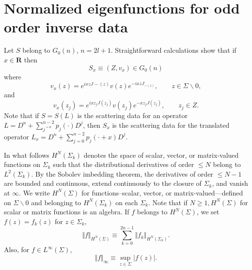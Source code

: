 \documentclass{surv-l}
\theoremstyle{plain}
\theoremstyle{definition}
\numberwithin{equation}{chapter}
\begin{document}
\section{Normalized eigenfunctions for odd order inverse data}\label{sec21} Let $S$ belong to $G_{0}(n)$, $n=2l + 1$. Straightforward calculations show that if $x\in \mathbf{R}$ then
\renewcommand{\theequation}{\thesection.\arabic{equation}}
\setcounter{equation}{0}
\begin{equation}\label{eq21.1}
S_{x}\equiv (Z, v_{x})\in G_{0}(n)
\end{equation}
where
\begin{equation}\label{eq21.2}
v_{x}(z)=e^{ixzJ-(z)}v(z)e^{-ixzJ_{-(z)}}, \qquad z\in\Sigma\backslash 0,
\end{equation}
and
\begin{equation}\label{eq21.3}
v_{x}(z_{j})=e^{ixz_{j}J(z_{j})}v(z_{j})e^{-xz_{j}J(z_{j})}, \qquad z_{j}\in Z.
\end{equation}
Note that if $S=S(L)$ is the scattering data for an operator $L=D^{n}+\sum_{j^{=0}}^{n-2}p_{j}(\cdot)D^{j}$, then $S_{x}$ is the scattering data for the translated operator $L_{x}= D^{n}+\sum_{j=0}^{n-2}p_{j}(\cdot+x)D^{j}$.


In what follows $H^{N}(\Sigma_{k})$ denotes the space of scalar, vector, or matrix-valued functions on $\Sigma_{k}$ such that the distributional derivatives of order $\leq N$ belong to $L^{2}(\Sigma_{k})$. By the Sobolev imbedding theorem, the derivatives of order $\leq N-1$ are bounded and continuous, extend continuously to the closure of $\Sigma_{k}$, and vanish at  $\infty$. We write $H^{N}(\Sigma)$ for functions--scalar, vector, or matrix-valued---defined on $\Sigma\backslash 0$ and belonging to $H^{N}(\Sigma_{k})$ on each $\Sigma_{k}$. Note that if $N\geq 1,H^{N}(\Sigma)$ for scalar or matrix functions is an algebra. If $f$ belongs to $H^{N}(\Sigma)$, we set $f(z)=f_{k}(z)$ for $z\in\Sigma_{k}$,
\begin{equation*}
\Vert f\Vert_{H^{N}(\Sigma)}\equiv\sum_{k=0}^{2n-1}\Vert f_{k}\Vert_{H^{N}(\Sigma_{k})}.
\end{equation*}
Also, for $f\in L^{\infty}(\Sigma)$,
\begin{equation*}
\Vert f\Vert_{\infty}\equiv\sup_{z\in\Sigma}|f(z)|.
\end{equation*}
\end{document}
